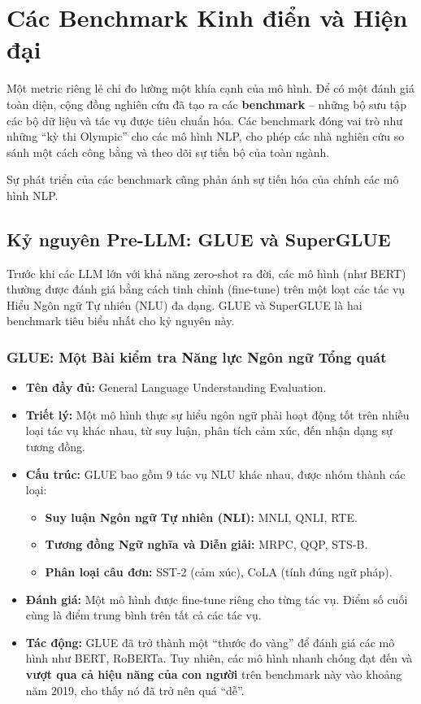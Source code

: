 
\section{Các Benchmark Kinh điển và Hiện đại}
\label{sec:benchmarks}

Một metric riêng lẻ chỉ đo lường một khía cạnh của mô hình. Để có một đánh giá toàn diện, cộng đồng nghiên cứu đã tạo ra các \textbf{benchmark} -- những bộ sưu tập các bộ dữ liệu và tác vụ được tiêu chuẩn hóa. Các benchmark đóng vai trò như những “kỳ thi Olympic” cho các mô hình NLP, cho phép các nhà nghiên cứu so sánh một cách công bằng và theo dõi sự tiến bộ của toàn ngành.

Sự phát triển của các benchmark cũng phản ánh sự tiến hóa của chính các mô hình NLP.

\subsection{Kỷ nguyên Pre-LLM: GLUE và SuperGLUE}
\label{ssec:pre_llm_benchmarks}
Trước khi các LLM lớn với khả năng zero-shot ra đời, các mô hình (như BERT) thường được đánh giá bằng cách tinh chỉnh (fine-tune) trên một loạt các tác vụ Hiểu Ngôn ngữ Tự nhiên (NLU) đa dạng. GLUE và SuperGLUE là hai benchmark tiêu biểu nhất cho kỷ nguyên này.

\subsubsection{GLUE: Một Bài kiểm tra Năng lực Ngôn ngữ Tổng quát}
\begin{itemize}
    \item \textbf{Tên đầy đủ:} General Language Understanding Evaluation.
    \item \textbf{Triết lý:} Một mô hình thực sự hiểu ngôn ngữ phải hoạt động tốt trên nhiều loại tác vụ khác nhau, từ suy luận, phân tích cảm xúc, đến nhận dạng sự tương đồng.
    \item \textbf{Cấu trúc:} GLUE bao gồm 9 tác vụ NLU khác nhau, được nhóm thành các loại:
        \begin{itemize}
            \item \textbf{Suy luận Ngôn ngữ Tự nhiên (NLI):} MNLI, QNLI, RTE.
            \item \textbf{Tương đồng Ngữ nghĩa và Diễn giải:} MRPC, QQP, STS-B.
            \item \textbf{Phân loại câu đơn:} SST-2 (cảm xúc), CoLA (tính đúng ngữ pháp).
        \end{itemize}
    \item \textbf{Đánh giá:} Một mô hình được fine-tune riêng cho từng tác vụ. Điểm số cuối cùng là điểm trung bình trên tất cả các tác vụ.
    \item \textbf{Tác động:} GLUE đã trở thành một “thước đo vàng” để đánh giá các mô hình như BERT, RoBERTa. Tuy nhiên, các mô hình nhanh chóng đạt đến và \textbf{vượt qua cả hiệu năng của con người} trên benchmark này vào khoảng năm 2019, cho thấy nó đã trở nên quá “dễ”.
\end{itemize}

